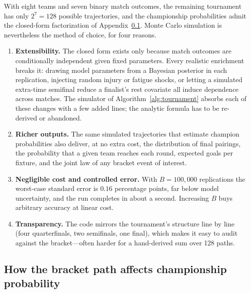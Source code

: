 With eight teams and seven binary match outcomes, the remaining tournament has
only $2^7 = 128$ possible trajectories, and the championship probabilities
admit the closed-form factorization of Appendix~\ref{app:path}. Monte Carlo
simulation is nevertheless the method of choice, for four reasons.

\begin{enumerate}
  \item \textbf{Extensibility.} The closed form exists only because match
        outcomes are conditionally independent given fixed parameters. Every
        realistic enrichment breaks it: drawing model parameters from a
        Bayesian posterior in each replication, injecting random injury or
        fatigue shocks, or letting a simulated extra-time semifinal reduce a
        finalist's rest covariate all induce dependence across matches.
        The simulator of Algorithm~\ref{alg:tournament} absorbs each of these
        changes with a few added lines; the analytic formula has to be
        re-derived or abandoned.
  \item \textbf{Richer outputs.} The same simulated trajectories that
        estimate champion probabilities also deliver, at no extra cost, the
        distribution of final pairings, the probability that a given team
        reaches each round, expected goals per fixture, and the joint law of
        any bracket event of interest.
  \item \textbf{Negligible cost and controlled error.} With $B = 100{,}000$
        replications the worst-case standard error is $0.16$ percentage
        points, far below model uncertainty, and the run completes in about a
        second. Increasing $B$ buys arbitrary accuracy at linear cost.
  \item \textbf{Transparency.} The code mirrors the tournament's structure
        line by line (four quarterfinals, two semifinals, one final), which
        makes it easy to audit against the bracket---often harder for a
        hand-derived sum over 128 paths.
\end{enumerate}

\subsection{How the bracket path affects championship probability}
\label{app:path}

